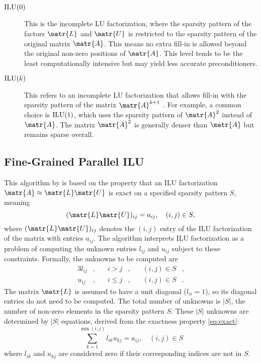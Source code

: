 \begin{description}
\item[\(\operatorname{ILU}(0)\)] This is the incomplete LU factorization, where the sparsity
  pattern of the factors \(\matr{L}\) and \(\matr{U}\) is restricted to the
  sparsity pattern of the original matrix \(\matr{A}\). This means no extra
  fill-in is allowed beyond the original non-zero positions of \(\matr{A}\).
  This level tends to be the least computationally intensive but may yield less
  accurate preconditioners.
\item[\(\operatorname{ILU}(k)\)] This refers to an incomplete LU factorization that allows
  fill-in with the sparsity pattern of the matrix \(\matr{A}^{k+1}\)
  \cite{noauthor_incomplete_2025}. For example, a common choice is \(\operatorname{ILU}(1)\),
  which uses the sparsity pattern of \(\matr{A}^{2}\) instead of \(\matr{A}\).
  The matrix \(\matr{A}^{2}\) is generally denser than \(\matr{A}\) but remains
  sparse overall.
\end{description}

\subsection{Fine-Grained Parallel ILU}
\label{sec:fine-grain-parall}

This algorithm by \textcite{chow_fine-grained_2015} is based on the property that
an ILU factorization \(\matr{A} \approx \matr{L} \matr{U}\) is exact on a specified
sparsity pattern \(S\), meaning
\begin{equation}
  \label{eq:exact}
  (\matr{L}\matr{U})_{ij} = a_{ij}, \quad (i,j) \in S,
\end{equation}
where \((\matr{L}\matr{U})_{ij}\) denotes the \((i,j)\) entry of the ILU
factorization of the matrix with entries \(a_{ij}\). The algorithm interprets
ILU factorization as a problem of computing the unknown entries \(l_{ij}\) and
\(u_{ij}\) subject to these constraints. Formally, the unknowns to be computed
are
\begin{alignat*}{3}
  l_{ij}&,\quad & i > j&,\quad & (i,j) \in S&, \\
  u_{ij}&,\quad & i \le j&,\quad & (i,j) \in S&.
\end{alignat*}
The matrix \(\matr{L}\) is assumed to have a unit diagonal (\(l_{ii} = 1\)), so
its diagonal entries do not need to be computed. The total number of unknowns is
\(|S|\), the number of non-zero elements in the sparsity pattern \(S\). These
\(|S|\) unknowns are determined by \(|S|\) equations, derived from the exactness
property \eqref{eq:exact}: \[\sum_{k=1}^{\min(i,j)}l_{ik}u_{kj} = a_{ij},\quad
  (i,j) \in S\] where \(l_{ik}\) and \(u_{kj}\) are considered zero if their
corresponding indices are not in \(S\).

